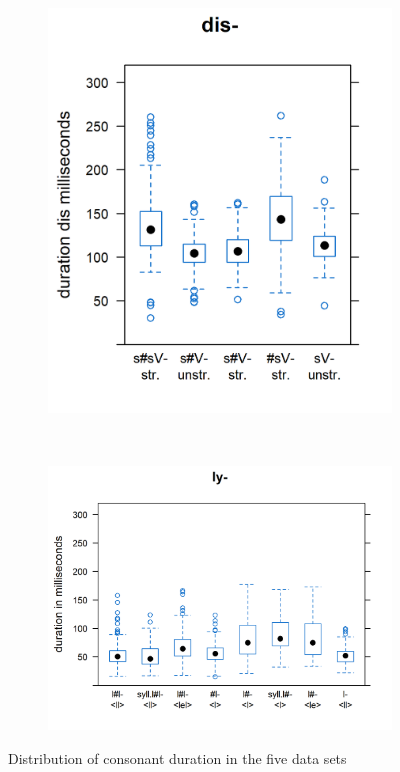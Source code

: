 \begin{figure}[h!]
	\begin{subfigure}
		\centering
		\includegraphics[scale=.55]{images/Experiment/boxDis}
	\end{subfigure}
	~
	\begin{subfigure}
		\centering
		\includegraphics[scale=.55]{images/Experiment/boxLy}
	\end{subfigure}				
	
	\caption{Distribution of consonant duration in the five data sets}
	\label{fig:Expeirment raw duration distribution}
\end{figure}



